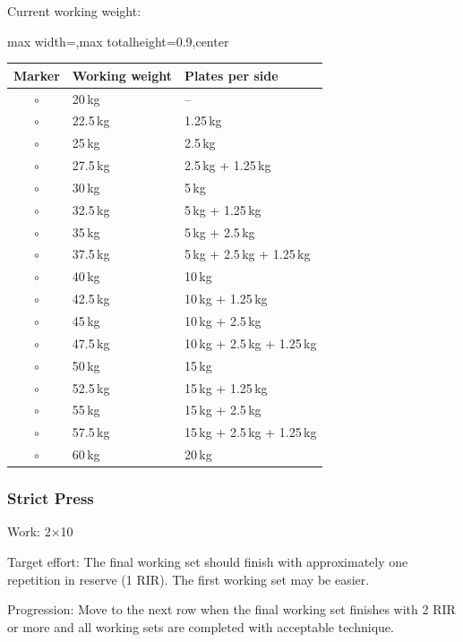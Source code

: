 \documentclass[11pt,a4paper]{article}
\newcommand{\tablearraystretch}{1.15}
\begin{document}
Current working weight:

\begin{center}
\renewcommand{\arraystretch}{\tablearraystretch}
\begin{adjustbox}{max width=\linewidth,max totalheight=0.9\textheight,center}
\begin{tabular}{cll}
\toprule
Marker & Working weight & Plates per side \\
\midrule
$\circ$ & 20\,kg   & -- \\
$\circ$ & 22.5\,kg & 1.25\,kg \\
$\circ$ & 25\,kg   & 2.5\,kg \\
$\circ$ & 27.5\,kg & 2.5\,kg + 1.25\,kg \\
$\circ$ & 30\,kg   & 5\,kg \\
$\circ$ & 32.5\,kg & 5\,kg + 1.25\,kg \\
$\circ$ & 35\,kg   & 5\,kg + 2.5\,kg \\
$\circ$ & 37.5\,kg & 5\,kg + 2.5\,kg + 1.25\,kg \\
$\circ$ & 40\,kg   & 10\,kg \\
$\circ$ & 42.5\,kg & 10\,kg + 1.25\,kg \\
$\circ$ & 45\,kg   & 10\,kg + 2.5\,kg \\
$\circ$ & 47.5\,kg & 10\,kg + 2.5\,kg + 1.25\,kg \\
$\circ$ & 50\,kg   & 15\,kg \\
$\circ$ & 52.5\,kg & 15\,kg + 1.25\,kg \\
$\circ$ & 55\,kg   & 15\,kg + 2.5\,kg \\
$\circ$ & 57.5\,kg & 15\,kg + 2.5\,kg + 1.25\,kg \\
$\circ$ & 60\,kg   & 20\,kg \\
\bottomrule
\end{tabular}
\end{adjustbox}
\renewcommand{\arraystretch}{1}
\end{center}

\newpage
\subsubsection{Strict Press}

Work: 2$\times$10

Target effort: The final working set should finish with approximately one repetition in reserve (1 RIR). The first working set may be easier.

Progression: Move to the next row when the final working set finishes with 2 RIR or more and all working sets are completed with acceptable technique.
\end{document}

